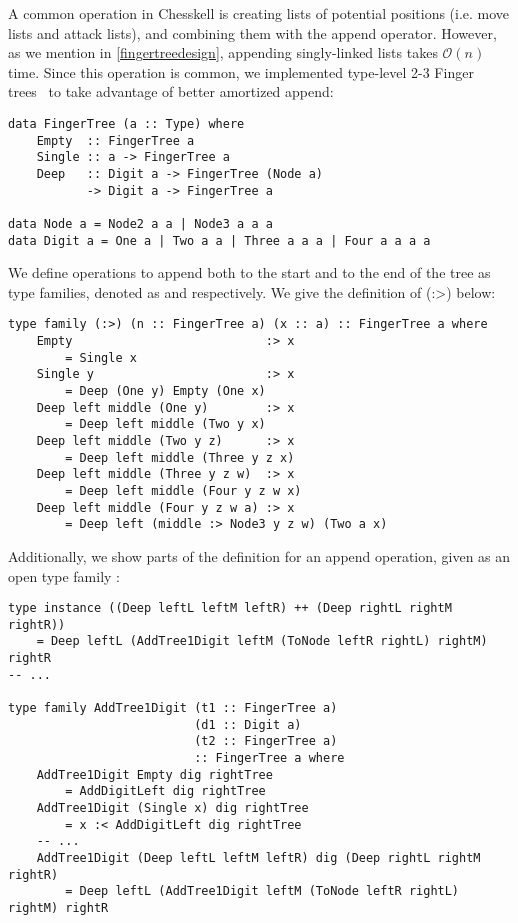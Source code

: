A common operation in Chesskell is creating lists of potential positions (i.e. move lists and attack lists), and combining them with the append \inline{(++)} operator. However, as we mention in \cref{fingertreedesign}, appending singly-linked lists takes $\mathcal{O}(n)$ time. Since this operation is common, we implemented type-level 2-3 Finger trees~\cite{fingertrees} to take advantage of better amortized append:

\begin{lstlisting}
data FingerTree (a :: Type) where
    Empty  :: FingerTree a
    Single :: a -> FingerTree a
    Deep   :: Digit a -> FingerTree (Node a) 
           -> Digit a -> FingerTree a

data Node a = Node2 a a | Node3 a a a
data Digit a = One a | Two a a | Three a a a | Four a a a a
\end{lstlisting}

We define operations to append both to the start and to the end of the tree as type families, denoted as \inline{:<} and \inline{:>} respectively. We give the definition of \inline(:>) below:

\begin{lstlisting}
type family (:>) (n :: FingerTree a) (x :: a) :: FingerTree a where
    Empty                           :> x
        = Single x
    Single y                        :> x
        = Deep (One y) Empty (One x)
    Deep left middle (One y)        :> x
        = Deep left middle (Two y x)
    Deep left middle (Two y z)      :> x
        = Deep left middle (Three y z x)
    Deep left middle (Three y z w)  :> x
        = Deep left middle (Four y z w x)
    Deep left middle (Four y z w a) :> x
        = Deep left (middle :> Node3 y z w) (Two a x)
\end{lstlisting}

Additionally, we show parts of the definition for an append operation, given as an open type family \inline{(++)}:

\begin{lstlisting}
type instance ((Deep leftL leftM leftR) ++ (Deep rightL rightM rightR))
    = Deep leftL (AddTree1Digit leftM (ToNode leftR rightL) rightM) rightR
-- ...

type family AddTree1Digit (t1 :: FingerTree a)
                          (d1 :: Digit a)
                          (t2 :: FingerTree a)
                          :: FingerTree a where
    AddTree1Digit Empty dig rightTree
        = AddDigitLeft dig rightTree
    AddTree1Digit (Single x) dig rightTree
        = x :< AddDigitLeft dig rightTree
    -- ...
    AddTree1Digit (Deep leftL leftM leftR) dig (Deep rightL rightM rightR)
        = Deep leftL (AddTree1Digit leftM (ToNode leftR rightL) rightM) rightR
\end{lstlisting}

